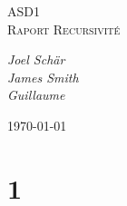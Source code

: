 \documentclass[a4paper]{article} %
\begin{document}
	
	\begin{titlepage}
		\centering
		
		\vspace{5cm}
		
		{\scshape\LARGE \color{Monokaimagenta} ASD1 \\ Raport Recursivité \par}
		
		\vspace{1cm}
		\vfill

		
		{\Large\itshape Joel Schär \\
			James Smith\\
			Guillaume \par}
		\vspace{4cm}
		\vfill
		
		
		{\large \today\par}
		
	\end{titlepage}

\phantom{}
\section{1}
	
\end{document}
